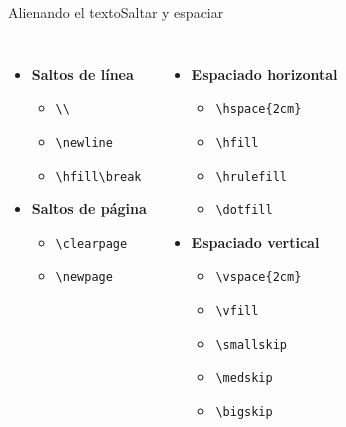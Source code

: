 \begin{frame}{Alienando el texto}{Saltar y espaciar}

    \begin{columns}
        \begin{itemize}
            \item \textbf{Saltos de línea}
            \begin{itemize}
                \item \texttt{\textbackslash\textbackslash}
                \item \texttt{\textbackslash newline}
                \item \texttt{\textbackslash hfill\textbackslash break}
            \end{itemize}

            \item \textbf{Saltos de página}
            \begin{itemize}
                \item \texttt{\textbackslash clearpage}
                \item \texttt{\textbackslash newpage}
            \end{itemize}
        \end{itemize}

        \pause
        
        \begin{itemize}
            \item \textbf{Espaciado horizontal}
            \begin{itemize}
                \item \texttt{\textbackslash hspace\{2cm\}}
                \item \texttt{\textbackslash hfill}
                \item \texttt{\textbackslash hrulefill}
                \item \texttt{\textbackslash dotfill}
            \end{itemize}
            
            \item \textbf{Espaciado vertical}
            \begin{itemize}
                \item \texttt{\textbackslash vspace\{2cm\}}
                \item \texttt{\textbackslash vfill}
                \item \texttt{\textbackslash smallskip}
                \item \texttt{\textbackslash medskip}
                \item \texttt{\textbackslash bigskip}
            \end{itemize}
        \end{itemize}
    \end{columns}
    
\end{frame}


